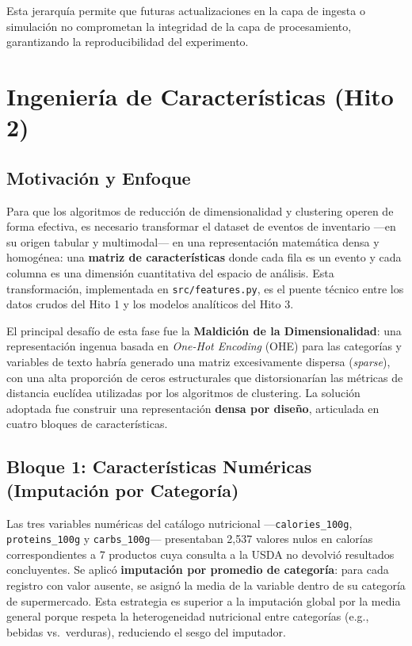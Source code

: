 \documentclass[12pt,a4paper]{article}
\newcommand{\code}[1]{\texttt{\small #1}}
\begin{document}
Esta jerarquía permite que futuras actualizaciones en la capa de ingesta o simulación no comprometan la integridad de la capa de procesamiento, garantizando la reproducibilidad del experimento.

\section{Ingeniería de Características (Hito 2)}

\subsection{Motivación y Enfoque}

Para que los algoritmos de reducción de dimensionalidad y clustering operen de forma efectiva, es necesario transformar el dataset de eventos de inventario —en su origen tabular y multimodal— en una representación matemática densa y homogénea: una \textbf{matriz de características} donde cada fila es un evento y cada columna es una dimensión cuantitativa del espacio de análisis. Esta transformación, implementada en \code{src/features.py}, es el puente técnico entre los datos crudos del Hito 1 y los modelos analíticos del Hito 3.

El principal desafío de esta fase fue la \textbf{Maldición de la Dimensionalidad}: una representación ingenua basada en \textit{One-Hot Encoding} (OHE) para las categorías y variables de texto habría generado una matriz excesivamente dispersa (\textit{sparse}), con una alta proporción de ceros estructurales que distorsionarían las métricas de distancia euclídea utilizadas por los algoritmos de clustering. La solución adoptada fue construir una representación \textbf{densa por diseño}, articulada en cuatro bloques de características.

\subsection{Bloque 1: Características Numéricas (Imputación por Categoría)}

Las tres variables numéricas del catálogo nutricional —\code{calories\_100g}, \code{proteins\_100g} y \code{carbs\_100g}— presentaban 2{,}537 valores nulos en calorías correspondientes a 7 productos cuya consulta a la USDA no devolvió resultados concluyentes. Se aplicó \textbf{imputación por promedio de categoría}: para cada registro con valor ausente, se asignó la media de la variable dentro de su categoría de supermercado. Esta estrategia es superior a la imputación global por la media general porque respeta la heterogeneidad nutricional entre categorías (e.g., bebidas vs.\ verduras), reduciendo el sesgo del imputador.
\end{document}
